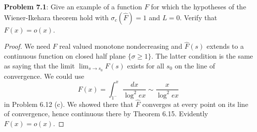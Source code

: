 \documentclass[12pt]{article}
\newcommand{\Fhat}{\widehat{F}}
\begin{document}
\fi

\textbf{Problem 7.1}: Give an example of a function $F$ for which the hypotheses of the Wiener-Ikehara theorem hold with $\sigma_c(\Fhat) = 1$ and $L = 0$. Verify that $F(x) = o(x)$.

\begin{proof}
We need $F$ real valued monotone nondecreasing and $\Fhat(s)$ extends to a continuous function on closed half plane $\{\sigma \geq 1\}$. The latter condition is the same as saying that the limit $\lim_{s \rightarrow s_0} \Fhat(s)$ exists for all $s_0$ on the line of convergence. We could use
$$F(x) = \int_{1^-}^x \frac{dx}{\log^2 ex} \sim \frac{x }{\log^2 ex}$$
in Problem 6.12 (c). We showed there that $\Fhat$ converges at every point on its line of convergence, hence continuous there by Theorem 6.15. Evidently $F(x) = o(x)$.
\end{proof}

\unless\ifdefined\IsMainDocument
\end{document}
